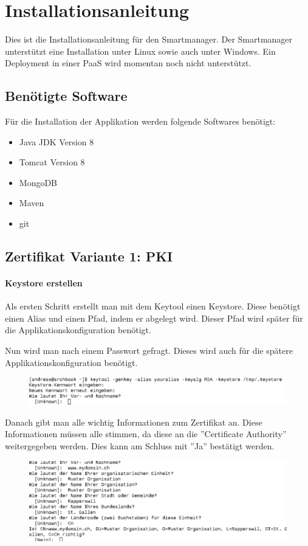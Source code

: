 \chapter{Installationsanleitung}
\label{sec:installation}
Dies ist die Installationsanleitung für den Smartmanager. Der Smartmanager unterstützt eine Installation unter Linux sowie auch unter Windows. Ein Deployment in einer PaaS wird momentan noch nicht unterstützt. 
\section{Benötigte Software}
Für die Installation der Applikation werden folgende Softwares benötigt:
\begin{itemize}
\item Java JDK Version 8
\item Tomcat Version 8
\item MongoDB
\item Maven
\item git
\end{itemize}
\section{Zertifikat Variante 1: PKI}
\subsubsection{Keystore erstellen}
Als ersten Schritt erstellt man mit dem Keytool einen Keystore. Diese benötigt einen Alias und einen Pfad, indem er abgelegt wird. Dieser Pfad wird später für die Applikationskonfiguration benötigt.
  
Nun wird man nach einem Passwort gefragt. Dieses wird auch für die spätere Applikationskonfiguration benötigt.
\begin{figure}[H]
\centering
\includegraphics[scale=0.65]{../05_Schlussbericht/images/keystore1.png}
\end{figure}
\newpage

Danach gibt man alle wichtig Informationen zum Zertifikat an. Diese Informationen müssen alle stimmen, da diese an die ''Certificate Authority'' weitergegeben werden. Dies kann am Schluss mit ''Ja'' bestätigt werden.
\begin{figure}[H]
\centering
\includegraphics[scale=0.65]{../05_Schlussbericht/images/keystore2.png}
\end{figure}

